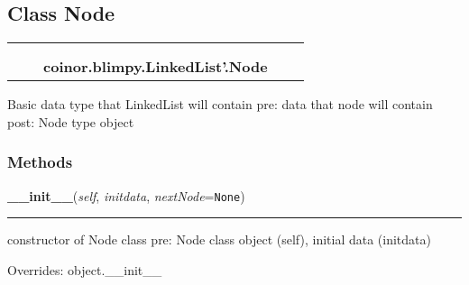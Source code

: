

\subsection{Class Node}

    \label{coinor:blimpy:LinkedList':Node}
\begin{tabular}{cccccc}
\multicolumn{2}{r}{\settowidth{\BCL}{object}\multirow{2}{\BCL}{object}}
&&
  \\\cline{3-3}
  &&\multicolumn{1}{c|}{}
&&
  \\
&&\multicolumn{2}{l}{\textbf{coinor.blimpy.LinkedList'.Node}}
\end{tabular}

Basic data type that LinkedList will contain pre: data that node will 
contain post: Node type object



  \subsubsection{Methods}

    \vspace{0.5ex}

\hspace{.8\funcindent}\begin{boxedminipage}{\funcwidth}

    \raggedright \textbf{\_\_init\_\_}(\textit{self}, \textit{initdata}, \textit{nextNode}={\tt None})

    \vspace{-1.5ex}

    \rule{\textwidth}{0.5\fboxrule}
\setlength{\parskip}{2ex}
    constructor of Node class pre: Node class object (self), initial data 
    (initdata)

\setlength{\parskip}{1ex}
      Overrides: object.\_\_init\_\_

    \end{boxedminipage}

